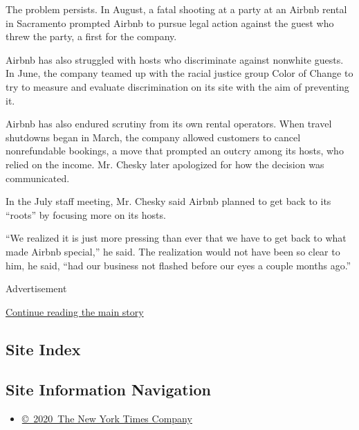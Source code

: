 The problem persists. In August, a fatal shooting at a party at an
Airbnb rental in Sacramento prompted Airbnb to pursue legal action
against the guest who threw the party, a first for the company.

Airbnb has also struggled with hosts who discriminate against nonwhite
guests. In June, the company teamed up with the racial justice group
Color of Change to try to measure and evaluate discrimination on its
site with the aim of preventing it.

Airbnb has also endured scrutiny from its own rental operators. When
travel shutdowns began in March, the company allowed customers to cancel
nonrefundable bookings, a move that prompted an outcry among its hosts,
who relied on the income. Mr. Chesky later apologized for how the
decision was communicated.

In the July staff meeting, Mr. Chesky said Airbnb planned to get back to
its ``roots'' by focusing more on its hosts.

``We realized it is just more pressing than ever that we have to get
back to what made Airbnb special,'' he said. The realization would not
have been so clear to him, he said, ``had our business not flashed
before our eyes a couple months ago.''

Advertisement

\protect\hyperlink{after-bottom}{Continue reading the main story}

\hypertarget{site-index}{%
\subsection{Site Index}\label{site-index}}

\hypertarget{site-information-navigation}{%
\subsection{Site Information
Navigation}\label{site-information-navigation}}

\begin{itemize}
\tightlist
\item
  \href{https://help.nytimes3xbfgragh.onion/hc/en-us/articles/115014792127-Copyright-notice}{©~2020~The
  New York Times Company}
\end{itemize}

